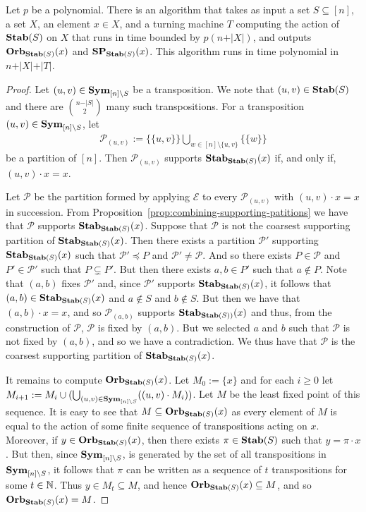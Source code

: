 \documentclass[../paper.tex]{subfiles}
\begin{document}
\begin{lem}
  \label{lem:computing-support-orbit}
  Let $p$ be a polynomial. There is an algorithm that takes as input a set $S
  \subseteq [n]$, a set $X$, an element $x \in X$, and a turning machine $T$
  computing the action of $\text{\textbf{Stab}}(S)$ on $X$ that runs in time bounded by $p(n +
  \vert X \vert)$, and outputs $\text{\textbf{Orb}}_{\text{\textbf{Stab}}(S)} (x)$ and $\text{\textbf{SP}}_{\text{\textbf{Stab}}(S)}(x)$.
  This algorithm runs in time polynomial in $n + \vert X \vert + \vert T \vert$.
\end{lem}
\begin{proof}
  Let $(u, v) \in \text{\textbf{Sym}}_{[n] \setminus S}$ be a transposition. We note that
  $(u,v) \in \text{\textbf{Stab}}(S)$ and there are ${n - \vert S \vert}\choose{2}$ many such
  transpositions. For a transposition $(u, v) \in \text{\textbf{Sym}}_{[n] \setminus S}$, let
  \begin{align*}
    \mathcal{P}_{(u,v)} := \{ \{u,v\}\} \bigcup_{w \in [n] \setminus \{ u,v \}} \{ \{ w \} \}
  \end{align*}
  be a partition of $[n]$. Then $\mathcal{P}_{(u,v)}$ supports
  $\text{\textbf{Stab}}_{\text{\textbf{Stab}}(S)}(x)$ if, and only if, $(u,v) \cdot x = x$.

  Let $\mathcal{P}$ be the partition formed by applying $\mathcal{E}$ to every
  $\mathcal{P}_{(u,v)}$ with $(u,v) \cdot x = x$ in succession. From
  Proposition~\ref{prop:combining-supporting-patitions} we have that
  $\mathcal{P}$ supports $\text{\textbf{Stab}}_{\text{\textbf{Stab}}(S)}(x)$. Suppose that $\mathcal{P}$ is
  not the coarsest supporting partition of $\text{\textbf{Stab}}_{\text{\textbf{Stab}}(S)}(x)$. Then there
  exists a partition $\mathcal{P}'$ supporting $\text{\textbf{Stab}}_{\text{\textbf{Stab}}(S)}(x)$ such that
  $\mathcal{P}' \preceq P$ and $\mathcal{P}' \neq \mathcal{P}$. And so there
  exists $P \in \mathcal{P}$ and $P' \in \mathcal{P}'$ such that $P \subsetneq
  P'$. But then there exists $a , b \in P'$ such that $a \not\in P$. Note that
  $(a,b)$ fixes $\mathcal{P}'$ and, since $\mathcal{P}'$ supports
  $\text{\textbf{Stab}}_{\text{\textbf{Stab}}(S)}(x)$, it follows that $(a,b) \in \text{\textbf{Stab}}_{\text{\textbf{Stab}}(S)}(x)$ and $a
  \not\in S$ and $b \not\in S$. But then we have that $(a,b) \cdot x = x$, and
  so $\mathcal{P}_{(a,b)}$ supports $\text{\textbf{Stab}}_{\text{\textbf{Stab}}(S))}(x)$ and thus, from the
  construction of $\mathcal{P}$, $\mathcal{P}$ is fixed by $(a,b)$. But we
  selected $a$ and $b$ such that $\mathcal{P}$ is not fixed by $(a,b)$, and so
  we have a contradiction. We thus have that $\mathcal{P}$ is the coarsest
  supporting partition of $\text{\textbf{Stab}}_{\text{\textbf{Stab}}(S)}(x)$.

  It remains to compute $\text{\textbf{Orb}}_{\text{\textbf{Stab}}(S)}(x)$. Let $M_0 := \{x\}$ and for each $i
  \geq 0$ let $M_{i+1} := M_i\cup (\bigcup_{(u,v) \in \text{\textbf{Sym}}_{[n] \setminus S}}
  ((u,v) \cdot M_i))$. Let $M$ be the least fixed point of this sequence. It is
  easy to see that $M \subseteq \text{\textbf{Orb}}_{\text{\textbf{Stab}}(S)}(x)$ as every element of $M$ is
  equal to the action of some finite sequence of transpositions acting on $x$.
  Moreover, if $y \in \text{\textbf{Orb}}_{\text{\textbf{Stab}}(S)}(x)$, then there exists $\pi \in \text{\textbf{Stab}}(S)$
  such that $y = \pi \cdot x$. But then, since $\text{\textbf{Sym}}_{[n] \setminus S}$, is
  generated by the set of all transpositions in $\text{\textbf{Sym}}_{[n] \setminus S}$, it
  follows that $\pi$ can be written as a sequence of $t$ transpositions for some
  $t \in \mathbb{N}$. Thus $y \in M_t \subseteq M$, and hence $\text{\textbf{Orb}}_{\text{\textbf{Stab}}(S)}(x)
  \subseteq M$, and so $\text{\textbf{Orb}}_{\text{\textbf{Stab}}(S)}(x) = M$.


\end{proof}
\end{document}
